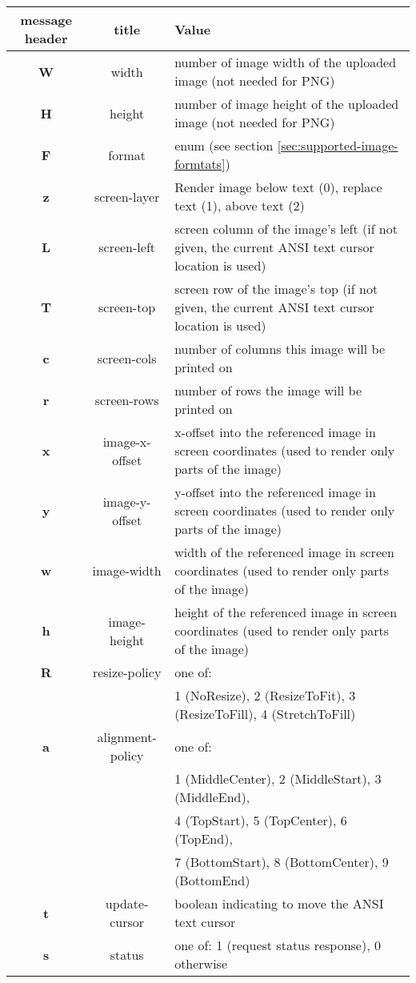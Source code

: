 \documentclass[a4paper]{article}
\begin{document}
\begin{tabular}{ |c|c|l| }
    \hline
    \textbf{message header}   & \textbf{title}   & \textbf{Value} \\
    \hline
    \textbf{W} & width            & number of image width of the uploaded image (not needed for PNG) \\
    \textbf{H} & height           & number of image height of the uploaded image (not needed for PNG) \\
    \textbf{F} & format           & enum (see section \ref{sec:supported-image-formtats}) \\
    \hline
    \textbf{z} & screen-layer     & Render image below text (0), replace text (1), above text (2) \\
    \textbf{L} & screen-left      & screen column of the image's left (if not given, the current ANSI text cursor location is used) \\
    \textbf{T} & screen-top       & screen row of the image's top (if not given, the current ANSI text cursor location is used) \\
    \textbf{c} & screen-cols      & number of columns this image will be printed on \\
    \textbf{r} & screen-rows      & number of rows the image will be printed on \\
    \textbf{x} & image-x-offset   & x-offset into the referenced image in screen coordinates (used to render only parts of the image) \\
    \textbf{y} & image-y-offset   & y-offset into the referenced image in screen coordinates (used to render only parts of the image) \\
    \textbf{w} & image-width      & width of the referenced image in screen coordinates (used to render only parts of the image) \\
    \textbf{h} & image-height     & height of the referenced image in screen coordinates (used to render only parts of the image) \\
    \textbf{R} & resize-policy    & one of: \\ %
               &                  & 1 (NoResize), 2 (ResizeToFit), 3 (ResizeToFill), 4 (StretchToFill) \\
    \textbf{a} & alignment-policy & one of: \\
               &                  & 1 (MiddleCenter), 2 (MiddleStart), 3 (MiddleEnd), \\
               &                  & 4 (TopStart), 5 (TopCenter), 6 (TopEnd), \\
               &                  & 7 (BottomStart), 8 (BottomCenter), 9 (BottomEnd) \\
    \textbf{t} & update-cursor    & boolean indicating to move the ANSI text cursor \\
    \textbf{s} & status           & one of: 1 (request status response), 0 otherwise \\
    \hline
\end{tabular}
\end{document}

